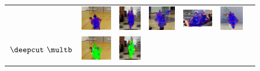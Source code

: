 \begin{figure}
  \centering
  \begin{tabular}{c c c c c c c}
    &
    \includegraphics[height=0.140\linewidth]{imgidx_1674_init_graph_mpii_multi.pdf}&
    \includegraphics[height=0.140\linewidth]{imgidx_0564_init_graph_mpii_multi.pdf}&
    \includegraphics[height=0.140\linewidth]{imgidx_1652_init_graph_mpii_multi.pdf}&
    \includegraphics[height=0.140\linewidth]{imgidx_0472_init_graph_mpii_multi.pdf}&
    \includegraphics[height=0.140\linewidth]{imgidx_0630_init_graph_mpii_multi.pdf}\\
    \begin{sideways}\bf\quad $\deepcut~\multb$\end{sideways}&
    \includegraphics[height=0.140\linewidth]{imgidx_1674_graph_mpii_multi.pdf}&
    \includegraphics[height=0.140\linewidth]{imgidx_0564_graph_mpii_multi.pdf}&

\end{tabular}
\end{figure}
